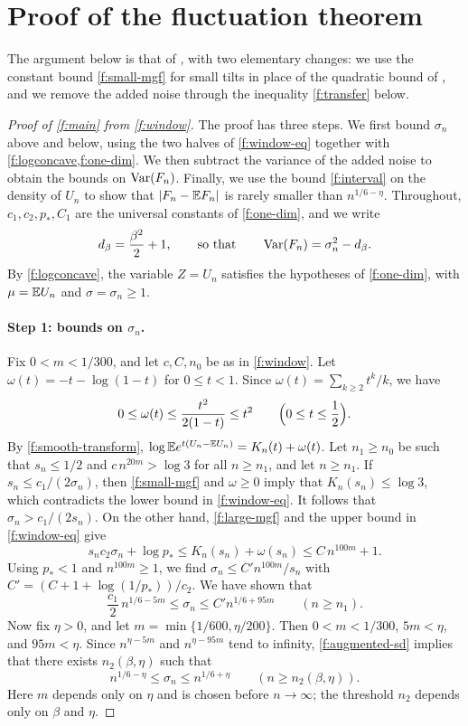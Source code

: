\section{Proof of the fluctuation theorem}\label{sec:fl-endgame}

The argument below is that of \cite[Section~7.6]{oai-fluctuations}, with two elementary changes: we use the constant bound \eqref{f:small-mgf} for small tilts in place of the quadratic bound of \cite[Lemma~7.7]{oai-fluctuations}, and we remove the added noise through the inequality \eqref{f:transfer} below.

\begin{proof}[Proof of \cref{f:main} from \cref{f:window}]
The proof has three steps. We first bound $\sigma_n$ above and below, using the two halves of \eqref{f:window-eq} together with \cref{f:logconcave,f:one-dim}. We then subtract the variance of the added noise to obtain the bounds on $\operatorname{Var}(F_n)$. Finally, we use the bound \eqref{f:interval} on the density of $U_n$ to show that $|F_n-\mathbb E F_n|$ is rarely smaller than $n^{1/6-\eta}$. Throughout, $c_1,c_2,p_*,C_1$ are the universal constants of \cref{f:one-dim}, and we write
\[
 d_\beta=\frac{\beta^2}{2}+1,\qquad\text{so that}\qquad \operatorname{Var}(F_n)=\sigma_n^2-d_\beta.
\]
By \cref{f:logconcave}, the variable $Z=U_n$ satisfies the hypotheses of \cref{f:one-dim}, with $\mu=\mathbb E U_n$ and $\sigma=\sigma_n\ge1$.

\paragraph{Step 1: bounds on $\sigma_n$.} Fix $0<m<1/300$, and let $c,C,n_0$ be as in \cref{f:window}. Let $\omega(t)=-t-\log(1-t)$ for $0\le t<1$. Since $\omega(t)=\sum_{k\ge2}t^k/k$, we have
\[
 0\le\omega(t)\le\frac{t^2}{2(1-t)}\le t^2\qquad\Bigl(0\le t\le\frac12\Bigr).
\]
By \eqref{f:smooth-transform}, $\log\mathbb E e^{t(U_n-\mathbb E U_n)}=K_n(t)+\omega(t)$. Let $n_1\ge n_0$ be such that $s_n\le1/2$ and $c\,n^{20m}>\log3$ for all $n\ge n_1$, and let $n\ge n_1$. If $s_n\le c_1/(2\sigma_n)$, then \eqref{f:small-mgf} and $\omega\ge0$ imply that $K_n(s_n)\le\log3$, which contradicts the lower bound in \eqref{f:window-eq}. It follows that $\sigma_n>c_1/(2s_n)$. On the other hand, \eqref{f:large-mgf} and the upper bound in \eqref{f:window-eq} give
\[
 s_nc_2\sigma_n+\log p_*\le K_n(s_n)+\omega(s_n)\le C\,n^{100m}+1.
\]
Using $p_*<1$ and $n^{100m}\ge1$, we find $\sigma_n\le C'n^{100m}/s_n$ with $C'=(C+1+\log(1/p_*))/c_2$. We have shown that
\begin{equation}\label{f:augmented-sd}
 \frac{c_1}{2}\,n^{1/6-5m}\le\sigma_n\le C'n^{1/6+95m}\qquad(n\ge n_1).
\end{equation}
Now fix $\eta>0$, and let $m=\min\{1/600,\eta/200\}$. Then $0<m<1/300$, $5m<\eta$, and $95m<\eta$. Since $n^{\eta-5m}$ and $n^{\eta-95m}$ tend to infinity, \eqref{f:augmented-sd} implies that there exists $n_2(\beta,\eta)$ such that
\begin{equation}\label{eq:fl-sigma-eta}
 n^{1/6-\eta}\le\sigma_n\le n^{1/6+\eta}\qquad(n\ge n_2(\beta,\eta)).
\end{equation}
Here $m$ depends only on $\eta$ and is chosen before $n\to\infty$; the threshold $n_2$ depends only on $\beta$ and $\eta$.


\end{proof}
